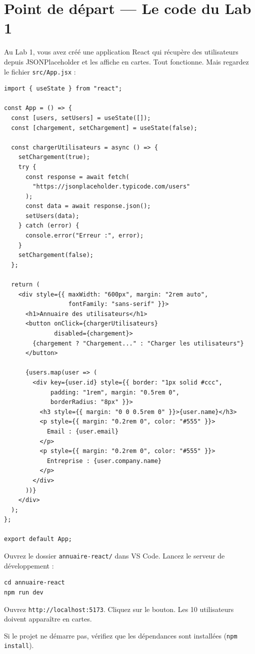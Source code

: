 \documentclass[11pt,a4paper]{article}
\begin{document}
\section{Point de départ --- Le code du Lab 1}
\label{sec:starter}

Au Lab 1, vous avez créé une application React qui récupère des utilisateurs depuis JSONPlaceholder et les affiche en cartes. Tout fonctionne. Mais regardez le fichier \texttt{src/App.jsx} :

\begin{lstlisting}
import { useState } from "react";

const App = () => {
  const [users, setUsers] = useState([]);
  const [chargement, setChargement] = useState(false);

  const chargerUtilisateurs = async () => {
    setChargement(true);
    try {
      const response = await fetch(
        "https://jsonplaceholder.typicode.com/users"
      );
      const data = await response.json();
      setUsers(data);
    } catch (error) {
      console.error("Erreur :", error);
    }
    setChargement(false);
  };

  return (
    <div style={{ maxWidth: "600px", margin: "2rem auto",
                  fontFamily: "sans-serif" }}>
      <h1>Annuaire des utilisateurs</h1>
      <button onClick={chargerUtilisateurs}
              disabled={chargement}>
        {chargement ? "Chargement..." : "Charger les utilisateurs"}
      </button>

      {users.map(user => (
        <div key={user.id} style={{ border: "1px solid #ccc",
             padding: "1rem", margin: "0.5rem 0",
             borderRadius: "8px" }}>
          <h3 style={{ margin: "0 0 0.5rem 0" }}>{user.name}</h3>
          <p style={{ margin: "0.2rem 0", color: "#555" }}>
            Email : {user.email}
          </p>
          <p style={{ margin: "0.2rem 0", color: "#555" }}>
            Entreprise : {user.company.name}
          </p>
        </div>
      ))}
    </div>
  );
};

export default App;
\end{lstlisting}

\begin{objectifbox}
Ouvrez le dossier \texttt{annuaire-react/} dans VS Code. Lancez le serveur de développement :

\begin{lstlisting}[style=terminal]
cd annuaire-react
npm run dev
\end{lstlisting}

Ouvrez \texttt{http://localhost:5173}. Cliquez sur le bouton. Les 10 utilisateurs doivent apparaître en cartes.

Si le projet ne démarre pas, vérifiez que les dépendances sont installées (\texttt{npm install}).
\end{objectifbox}
\end{document}
